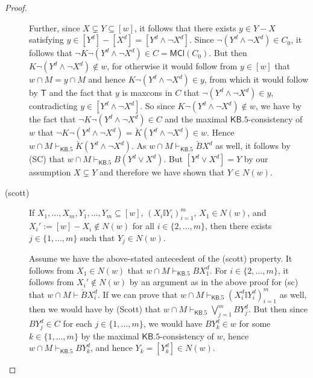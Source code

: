 \documentclass[12pt]{article}
\theoremstyle{definition}
\newcommand{\KBeq}{{\mathsf{KB.5}}}             %
\newcommand{\MCl}{\mathsf{MCl}}                   %
\begin{document}
\begin{proof}
\begin{description}
    Further, since $X\subsetneq Y\subseteq[w]$, it follows that there
    exists $y\in Y-X$ satisfying
    $y\in[Y^d]-[X^d]=[Y^d\land\lnot X^d]$.  Since
    $\lnot(Y^d\land\lnot X^d)\in C_0$, it follows that
    $\lnot K\lnot(Y^d\land\lnot X^d)\in C=\MCl(C_0)$.  But then
    $K\lnot(Y^d\land\lnot X^d)\notin w$, for otherwise it would follow
    from $y\in[w]$ that $w\cap M=y\cap M$ and hence
    $K\lnot(Y^d\land\lnot X^d)\in y$, from which it would follow by
    $\mathsf{T}$ and the fact that $y$ is maxcons in $C$ that
    $\lnot(Y^d\land\lnot X^d)\in y$, contradicting
    $y\in [Y^d\land\lnot X^d]$.  So since
    $K\lnot(Y^d\land\lnot X^d)\notin w$, we have by the fact that
    $\lnot K\lnot(Y^d\land\lnot X^d)\in C$ and the maximal
    $\KBeq$-consistency of $w$ that
    $\lnot K\lnot (Y^d\land\lnot X^d)= \check K(Y^d\land\lnot X^d)\in
    w$.
    Hence $w\cap M\vdash_\KBeq \check K(Y^d\land\lnot X^d)$. As
    $w\cap M\vdash_\KBeq\check B X^d$ as well, it follows by (SC) that
    $w\cap M\vdash_\KBeq B(Y^d\lor X^d)$.  But $[Y^d\lor X^d]=Y$ by
    our assumption $X\subsetneq Y$ and therefore we have shown that
    $Y\in N(w)$.

  \item[(scott)] If $X_1,\dots,X_m,Y_1,\dots,Y_m\subseteq[w]$,
    $(X_i\mathbb{I}Y_i)_{i=1}^m$, $X_1\in N(w)$, and
    $X_i':=[w]-X_i\notin N(w)$ for all $i\in\{2,\dots,m\}$, then there
    exists $j\in\{1,\dots,m\}$ such that $Y_j\in N(w)$.

    Assume we have the above-stated antecedent of the (scott)
    property.  It follows from $X_1\in N(w)$ that
    $w\cap M\vdash_\KBeq BX_1^d$.  For $i\in\{2,\dots,m\}$, it follows
    from $X_i'\notin N(w)$ by an argument as in the above proof for
    (sc) that $w\cap M\vdash\check BX_i^d$. If we can prove that
    $w\cap M\vdash_\KBeq (X_i^d\mathbb{I}Y_i^d)_{i=1}^m$ as well, then
    we would have by (Scott) that
    $w\cap M\vdash_\KBeq\bigvee_{j=1}^m BY_j^d$. But then since
    $BY_j^d\in C$ for each $j\in\{1,\dots,m\}$, we would have
    $BY_k^d\in w$ for some $k\in\{1,\dots,m\}$ by the maximal
    $\KBeq$-consistency of $w$, hence $w\cap M\vdash_\KBeq BY_k^d$,
    and hence $Y_k=[Y_k^d]\in N(w)$.


\end{description}
\end{proof}
\end{document}

